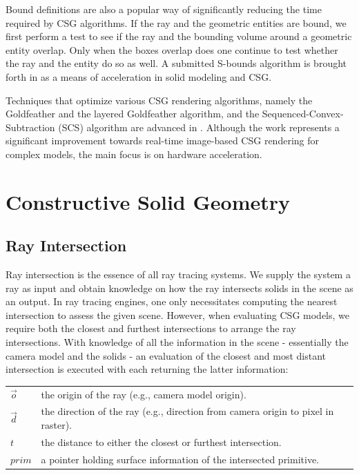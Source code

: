 \documentclass[a4paper,11pt,oneside]{article}
\makeatletter
\newenvironment{conditions}
  {\par\vspace{\abovedisplayskip}\noindent\begin{tabular}{>{$}l<{$} @{${}={}$} l}}
  {\end{tabular}\par\vspace{\belowdisplayskip}}
\makeatother
\begin{document}
Bound definitions are also a popular way of significantly reducing the time required by CSG algorithms. If the ray and the geometric entities are bound, we first perform a test to see if the ray and the bounding volume around a geometric entity overlap. Only when the boxes overlap does one continue to test whether the ray and the entity do so as well. A submitted S-bounds algorithm is brought forth in \cite{bounding_algorithms} as a means of acceleration in solid modeling and CSG.
  
Techniques that optimize various CSG rendering algorithms, namely the Goldfeather and the layered Goldfeather algorithm, and the Sequenced-Convex- Subtraction (SCS) algorithm are advanced in \cite{hardware_accelerated_image_based_csg.}. Although the work represents a significant improvement towards real-time image-based CSG rendering for complex models,  the main focus is on hardware acceleration.
  

\section{Constructive Solid Geometry}
    
\subsection{Ray Intersection}
\label{section:ray-intersection}

Ray intersection is the essence of all ray tracing systems. We supply the system a ray as input and obtain knowledge on how the ray intersects solids in the scene as an output. In ray tracing engines, one only necessitates computing the nearest intersection to assess the given scene. However, when evaluating CSG models, we require both the closest and furthest intersections to arrange the ray intersections. With knowledge of all the information in the scene - essentially the camera model and the solids - an evaluation of the closest and most distant intersection is executed with each returning the latter information:

\begin{conditions}
	\vec{o}     & the origin of the ray (e.g., camera model origin). \\
	\vec{d}     & the direction of the ray (e.g., direction from camera origin to pixel in raster). \\
	t     &  the distance to either the closest or furthest intersection. \\
	prim    &  a pointer holding surface information of the intersected primitive. 
\end{conditions}
\end{document}
